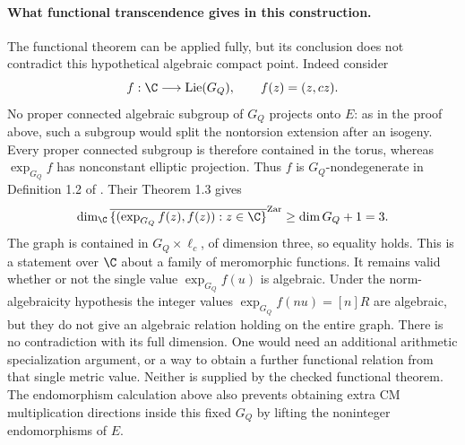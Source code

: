 \paragraph{What functional transcendence gives in this construction.}
The functional theorem can be applied fully, but its conclusion
does not contradict this hypothetical algebraic compact point.
Indeed consider
\[
 f:\C\longrightarrow\operatorname{Lie}(G_Q),\qquad
 f(z)=(z,cz).
\]
No proper connected algebraic subgroup of $G_Q$ projects
onto $E$: as in the proof above, such a subgroup would split
the nontorsion extension after an isogeny. Every proper
connected subgroup is therefore contained in the torus,
whereas $\exp_{G_Q}f$ has nonconstant elliptic projection.
Thus $f$ is $G_Q$-nondegenerate in Definition 1.2 of
\citet{noguchi2024}. Their Theorem 1.3 gives
\[
 \dim_{\C}\overline{\{(\exp_{G_Q}f(z),f(z)):z\in\C\}}^{\rm Zar}
       \ge \dim G_Q+1=3.
\]
The graph is contained in $G_Q\times\ell_c$, of dimension
three, so equality holds. This is a statement over $\C$
about a family of meromorphic functions. It remains valid
whether or not the single value $\exp_{G_Q}f(u)$ is
algebraic. Under the norm-algebraicity hypothesis the integer
values $\exp_{G_Q}f(nu)=[n]R$ are algebraic, but they do
not give an algebraic relation holding on the entire graph.
There is no contradiction with its full dimension.
One would need an additional arithmetic specialization
argument, or a way to obtain a further functional relation
from that single metric value. Neither is supplied by the
checked functional theorem. The endomorphism calculation
above also prevents obtaining extra CM multiplication
directions inside this fixed $G_Q$ by lifting the
noninteger endomorphisms of $E$.
